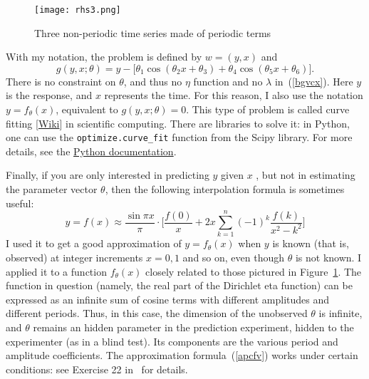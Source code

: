 \documentclass[oneside,10pt]{book}
\begin{document}
\begin{figure}[H]
\centering
\texttt{[image: rhs3.png]}  
\caption{Three non-periodic time series made of periodic terms}
\label{fig:rhs3v2}
\end{figure}


With my notation, the problem is 
 defined by $w=(y,x)$ and
 \begin{equation}
g(y,x;\theta)= y - \Big[\theta_1 \cos(\theta_2 x + \theta_3) + \theta_4\cos (\theta_5 x + \theta_6)\Big]. \label{rtfer}
\end{equation}
There is no constraint on $\theta$, and thus no $\eta$ function and no $\lambda$ in~(\ref{bgvcx}). Here $y$ is the response, and $x$ represents the time. For this reason, I also use the notation $y=f_\theta(x)$, equivalent to $g(y,x;\theta)=0$. This type of problem is called \textcolor{index}{curve fitting} 
 [\href{https://en.wikipedia.org/wiki/Curve_fitting}{Wiki}] in scientific computing. There are libraries to solve it: in Python,
 one can use the \texttt{optimize.curve\_fit} function from the Scipy library. For more details, see the
 \href{https://docs.scipy.org/doc/scipy/reference/generated/scipy.optimize.curve_fit.html}{Python documentation}. 



Finally, if you are only interested in predicting $y$ given $x$ , but not in estimating the parameter vector $\theta$, then the following interpolation formula 
is sometimes useful:
\begin{equation}
y=f(x)\approx \frac{\sin\pi x}{\pi}\cdot \Bigg[ \frac{f(0)}{x} + 2x\sum_{k=1}^n (-1)^k \frac{f(k)}{x^2-k^2}\Bigg] \label{apcfv}
\end{equation}
I used it  to get a good approximation of $y=f_\theta(x)$ when $y$ is known (that is, observed) at
integer increments $x=0,1$ and so on, even though $\theta$ is not known. I applied it to a function $f_\theta(x)$ closely related
to those pictured in Figure~\ref{fig:rhs3v2}. The function in question (namely, the real part of the Dirichlet eta function) can be expressed as an infinite sum of cosine terms with different amplitudes and different periods.
 Thus, in this case, the dimension of the unobserved $\theta$ is infinite, and $\theta$ remains an hidden parameter in the prediction experiment, hidden to the experimenter (as in a blind test). Its components are the various period and amplitude coefficients. 
 The approximation formula~(\ref{apcfv}) works under certain conditions: see Exercise 22 in~\cite{vgelsevier} for details. 
\end{document}

